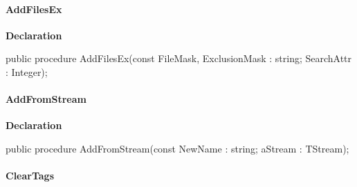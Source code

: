 \documentclass{report}
\newif\ifpdf
\begin{document}
\paragraph*{AddFilesEx}\hspace*{\fill}

\label{AbArcTyp.TAbArchive-AddFilesEx}
\begin{list}{}{
\setlength{\itemindent}{0cm}
\setlength{\listparindent}{0cm}
\setlength{\leftmargin}{\evensidemargin}
\addtolength{\leftmargin}{\tmplength}
\settowidth{\labelsep}{X}
\addtolength{\leftmargin}{\labelsep}
\setlength{\labelwidth}{\tmplength}
}
\item[\textbf{Declaration}\hfill]
\ifpdf
\begin{flushleft}
\fi
\begin{ttfamily}
public procedure AddFilesEx(const FileMask, ExclusionMask : string; SearchAttr : Integer);\end{ttfamily}

\ifpdf
\end{flushleft}
\fi

\end{list}
\paragraph*{AddFromStream}\hspace*{\fill}

\label{AbArcTyp.TAbArchive-AddFromStream}
\begin{list}{}{
\setlength{\itemindent}{0cm}
\setlength{\listparindent}{0cm}
\setlength{\leftmargin}{\evensidemargin}
\addtolength{\leftmargin}{\tmplength}
\settowidth{\labelsep}{X}
\addtolength{\leftmargin}{\labelsep}
\setlength{\labelwidth}{\tmplength}
}
\item[\textbf{Declaration}\hfill]
\ifpdf
\begin{flushleft}
\fi
\begin{ttfamily}
public procedure AddFromStream(const NewName : string; aStream : TStream);\end{ttfamily}

\ifpdf
\end{flushleft}
\fi

\end{list}
\paragraph*{ClearTags}\hspace*{\fill}
\end{document}
